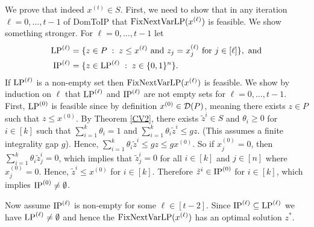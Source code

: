 We prove that indeed $x^{(t)}\in S$. First, we need to show that in any iteration $\ell=  0,\ldots,t-1$ of DomToIP that $\operatorname{{{FixNextVarLP}}}(x^{(\ell)})$ is feasible. We show something stronger. For $\ell=0,\ldots,t-1$ let
\begin{align*}
\operatorname{LP}^{(\ell)}&= \{z\in P\; : \; z\leq x^{(\ell)} \mbox{ and } z_j=x_j^{(\ell)} \mbox{ for } j\in [\ell]\}, \text{ and}\\
\operatorname{IP}^{(\ell)}&= \{z\in \operatorname{LP}^{(\ell)}\; : \; z\in \{0,1\}^n\}.
\end{align*}
If $\operatorname{LP}^{(\ell)}$ is a non-empty set then $\operatorname{{{FixNextVarLP}}}(x^{(\ell)})$ is feasible. We show by induction on $\ell$ that $\operatorname{LP}^{(\ell)}$ and $\operatorname{IP}^{(\ell)}$ are not empty sets for $\ell=0,\ldots,t-1$. First, $\operatorname{LP}^{(0)}$ is feasible since by definition $x^{(0)}\in \operatorname{\mathcal{D}}(P)$, meaning there exists $z\in P$ such that $z\leq x^{(0)}$. By Theorem \ref{CV2}, there exists $\tilde{z}^i\in S$ and $\theta_i\geq 0$ for $i\in [k]$ such that $\sum_{i=1}^{k} \theta_i = 1$ and $\sum_{i=1}^{k}\theta_i \tilde{z}^i \leq gz$. (This assumes a finite integrality gap $g$).
Hence, $\sum_{i=1}^{k}\theta_i \tilde{z}^i \leq gz\leq gx^{(0)}$. So if $x^{(0)}_j=0$, then $ \sum_{i=1}^{k}\theta_i \tilde{z}_j^i =0$, which implies that $\tilde{z}^i_j=0$ for all $i\in [k]$ and $j\in [n]$ where $x^{(0)}_j=0$. Hence, $\tilde{z}^i\leq x^{(0)}$ for $i\in [k]$. Therefore $\tilde{z}^i\in \operatorname{IP}^{(0)}$ for $i\in [k]$, which implies $\operatorname{IP}^{(0)}\neq \emptyset$.

Now assume $\operatorname{IP}^{(\ell)}$ is non-empty for some $\ell \in [t-2]$. Since $\operatorname{IP}^{(\ell)}\subseteq\operatorname{LP}^{(\ell)}$ we have $\operatorname{LP}^{(\ell)}\neq \emptyset$ and hence the $\operatorname{{{FixNextVarLP}}}(x^{(\ell)})$ has an optimal solution $z^*$.

